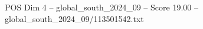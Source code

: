 \begin{textsample}{POS Dim 4 – global\_south\_2024\_09 – Score 19.00 – global\_south\_2024\_09/113501542.txt}
\end{textsample}
